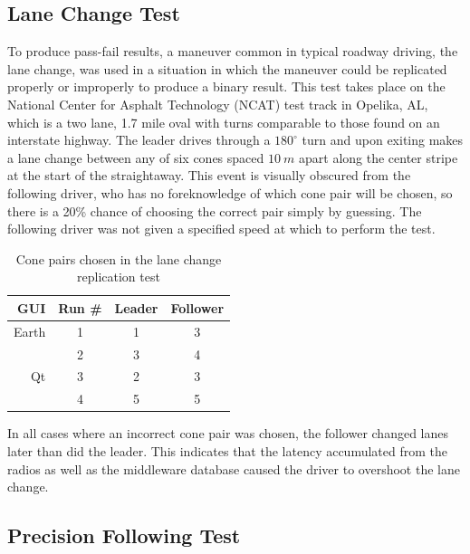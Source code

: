 \documentclass[twocolumn,10pt]{article}
\begin{document}
  \subsection*{Lane Change Test}

    To produce pass-fail results, a maneuver common in typical roadway driving, the lane change, was used in a situation in which the maneuver could be replicated properly or improperly to produce a binary result.  This test takes place on the National Center for Asphalt Technology (NCAT) test track in Opelika, AL, which is a two lane, 1.7 mile oval with turns comparable to those found on an interstate highway.  The leader drives through a $180^{\circ}$ turn and upon exiting makes a lane change between any of six cones spaced $10~m$ apart along the center stripe at the start of the straightaway.  This event is visually obscured from the following driver, who has no foreknowledge of which cone pair will be chosen, so there is a 20\% chance of choosing the correct pair simply by guessing.  The following driver was not given a specified speed at which to perform the test.

    \begin{table}[htbp] \centering
      \caption{Cone pairs chosen in the lane change replication test}
      \begin{tabular}{rc|cc} 
        GUI&    Run \#  &     Leader&    Follower \\\hline\hline
        Earth&      1       &       1   &    3 \\
             &      2       &       3   &    4 \\ \hline
        Qt   &      3       &       2   &    3 \\
             &      4       &       5   &    5 \\ \hline   
      \end{tabular}
      \label{tab:lanechangeresults}
    \end{table}

    In all cases where an incorrect cone pair was chosen, the follower changed lanes later than did the leader.  This indicates that the latency accumulated from the radios as well as the middleware database caused the driver to overshoot the lane change.


  \subsection*{Precision Following Test}
\end{document}
